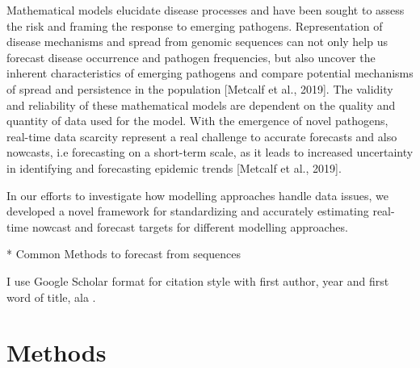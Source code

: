 \documentclass[11pt,oneside,letterpaper]{article}
\begin{document}
Mathematical models elucidate disease processes and have been sought to assess the risk and framing the response to emerging pathogens. 
Representation of disease mechanisms and spread from genomic sequences can not only help us forecast disease occurrence and pathogen frequencies, but also uncover the inherent characteristics of emerging pathogens and compare potential mechanisms of spread and persistence in the population [Metcalf et al., 2019].
The validity and reliability of these mathematical models are dependent on the quality and quantity of data used for the model.
With the emergence of novel pathogens, real-time data scarcity represent a real challenge to accurate forecasts and also nowcasts, i.e forecasting on a short-term scale, as it leads to 
increased uncertainty in identifying and forecasting epidemic trends [Metcalf et al., 2019].





In our efforts to investigate how modelling approaches handle data issues, 
we developed a novel framework for standardizing and accurately estimating real-time nowcast and forecast targets for different modelling approaches.











* Common Methods to forecast from sequences












I use Google Scholar format for citation style with first author, year and first word of title, ala \cite{hadfield2018nextstrain}.

\section*{Methods}
\end{document}
